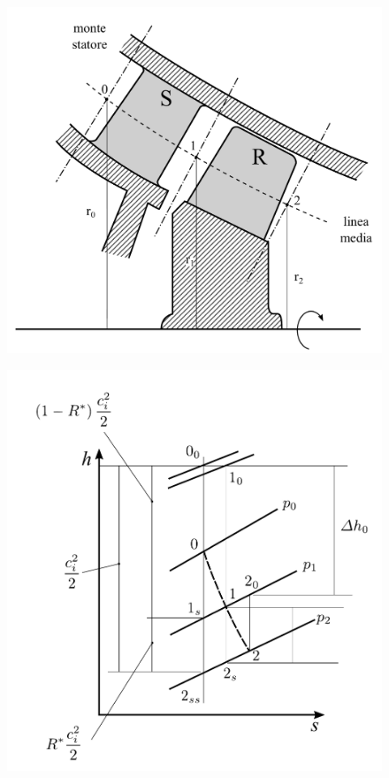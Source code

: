 \begin{figure}
\centering
\begin{minipage}{.5\textwidth}
  \centering
  \includegraphics[width=.95\linewidth]{fig/SezioneTurbina.pdf}
  \label{fig:SezioneTurbina}
\end{minipage}%
\begin{minipage}{.5\textwidth}
  \centering
  \includegraphics[width=.95\linewidth]{fig/hsturbine.pdf}
  \label{fig:hsturbine}
\end{minipage}
\end{figure}
